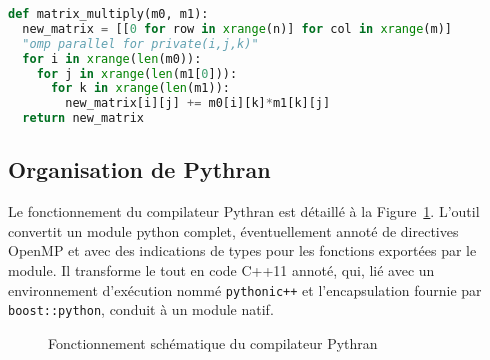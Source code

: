 \documentclass[renpar]{compas2013}
\begin{document}
\begin{lstlisting}[language=python, label={lst:pythran-mat-mul},caption={multiplication de matrice avec
  annotations OpenMP}]
def matrix_multiply(m0, m1):
  new_matrix = [[0 for row in xrange(n)] for col in xrange(m)]
  "omp parallel for private(i,j,k)"
  for i in xrange(len(m0)):
    for j in xrange(len(m1[0])):
      for k in xrange(len(m1)):
        new_matrix[i][j] += m0[i][k]*m1[k][j]
  return new_matrix
\end{lstlisting}


\subsection{Organisation de Pythran}

Le fonctionnement du compilateur Pythran est détaillé à la
Figure~\ref{fig:pythran}. L'outil convertit un module python complet,
éventuellement annoté de directives OpenMP et avec des indications de
types pour les fonctions exportées par le module. Il transforme le tout en
code C++11 annoté, qui, lié avec un environnement d'exécution nommé
\texttt{pythonic++} et l'encapsulation fournie par \texttt{boost::python},
conduit à un module natif.

\begin{figure}
  \centering

  \caption{Fonctionnement schématique du compilateur Pythran}
  \label{fig:pythran}
\end{figure}
\end{document}
